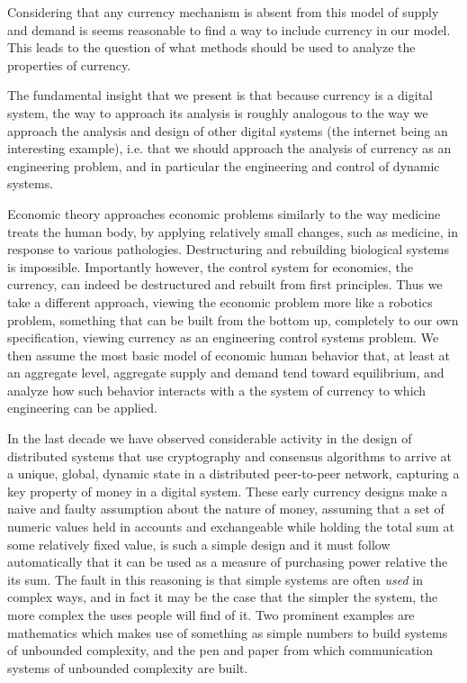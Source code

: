 Considering that any currency mechanism is absent from this model of supply and demand is seems
reasonable to find a way to include currency in our model. This leads to the question of what
methods should be used to analyze the properties of currency.

The fundamental insight that we present is that because currency is a digital system, the way to
approach its analysis is roughly analogous to the way we approach the analysis and design of other
digital systems (the internet being an interesting example), i.e. that we should approach the analysis of
currency as an engineering problem, and in particular the engineering and control of
dynamic systems. 

Economic theory approaches economic problems similarly to the way medicine treats the human body, by
applying relatively small changes, such as medicine, in response to various pathologies.
Destructuring and rebuilding biological systems is impossible. Importantly however, the control
system for economies, the currency, can indeed be destructured and rebuilt from first principles.
Thus we take a different approach, viewing the economic problem more like a robotics problem,
something that can be built from the bottom up, completely to our own specification, viewing
currency as an engineering control systems problem. We then assume the most basic model of economic
human behavior that, at least at an aggregate level, aggregate supply and demand tend toward
equilibrium, and analyze how such behavior interacts with a the system of currency to which
engineering can be applied.

In the last decade we have observed considerable activity in the design of distributed systems that
use cryptography and consensus algorithms to arrive at a unique, global, dynamic state in a
distributed peer-to-peer network, capturing a key property of money in a digital system. These early
currency designs make a naive and faulty assumption about the nature of money, assuming that a set
of numeric values held in accounts and exchangeable while holding the total sum at some relatively
fixed value, is such a simple design and it must follow automatically that it can be used as a
measure of purchasing power relative the its sum. The fault in this reasoning is that simple systems
are often \emph{used} in complex ways, and in fact it may be the case that the simpler the system,
the more complex the uses people will find of it. Two prominent examples are mathematics which makes
use of something as simple numbers to build systems of unbounded complexity, and the pen and paper
from which communication systems of unbounded complexity are built.

